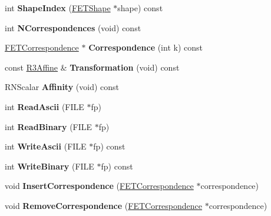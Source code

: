 \begin{DoxyCompactItemize}
\item 
int {\bfseries Shape\+Index} (\hyperlink{struct_f_e_t_shape}{F\+E\+T\+Shape} $\ast$shape) const \hypertarget{struct_f_e_t_match_a478ce4bcfb8b40f02ce15eede38cee40}{}\label{struct_f_e_t_match_a478ce4bcfb8b40f02ce15eede38cee40}

\item 
int {\bfseries N\+Correspondences} (void) const \hypertarget{struct_f_e_t_match_aeed07dd113bd282683fab8a2e571155c}{}\label{struct_f_e_t_match_aeed07dd113bd282683fab8a2e571155c}

\item 
\hyperlink{struct_f_e_t_correspondence}{F\+E\+T\+Correspondence} $\ast$ {\bfseries Correspondence} (int k) const \hypertarget{struct_f_e_t_match_a2b0a7502f99bd81638638783172712d9}{}\label{struct_f_e_t_match_a2b0a7502f99bd81638638783172712d9}

\item 
const \hyperlink{class_r3_affine}{R3\+Affine} \& {\bfseries Transformation} (void) const \hypertarget{struct_f_e_t_match_aaf48f529ceb079668a763c1973f849f1}{}\label{struct_f_e_t_match_aaf48f529ceb079668a763c1973f849f1}

\item 
R\+N\+Scalar {\bfseries Affinity} (void) const \hypertarget{struct_f_e_t_match_a4664694fe54dc49199419abf57dfea6f}{}\label{struct_f_e_t_match_a4664694fe54dc49199419abf57dfea6f}

\item 
int {\bfseries Read\+Ascii} (F\+I\+LE $\ast$fp)\hypertarget{struct_f_e_t_match_ab6fada98b0105c74d8ea603b25fa2a2b}{}\label{struct_f_e_t_match_ab6fada98b0105c74d8ea603b25fa2a2b}

\item 
int {\bfseries Read\+Binary} (F\+I\+LE $\ast$fp)\hypertarget{struct_f_e_t_match_a4fd8ec42dfdeffb1b7a9e9fdce7d6428}{}\label{struct_f_e_t_match_a4fd8ec42dfdeffb1b7a9e9fdce7d6428}

\item 
int {\bfseries Write\+Ascii} (F\+I\+LE $\ast$fp) const \hypertarget{struct_f_e_t_match_ae4342be77ec172fe1d35a3503c981efe}{}\label{struct_f_e_t_match_ae4342be77ec172fe1d35a3503c981efe}

\item 
int {\bfseries Write\+Binary} (F\+I\+LE $\ast$fp) const \hypertarget{struct_f_e_t_match_a7ca40aaaf3b559c8d6a665f675048cef}{}\label{struct_f_e_t_match_a7ca40aaaf3b559c8d6a665f675048cef}

\item 
void {\bfseries Insert\+Correspondence} (\hyperlink{struct_f_e_t_correspondence}{F\+E\+T\+Correspondence} $\ast$correspondence)\hypertarget{struct_f_e_t_match_a53a5f45347c6e5e6f81b0d1a5a010c6a}{}\label{struct_f_e_t_match_a53a5f45347c6e5e6f81b0d1a5a010c6a}

\item 
void {\bfseries Remove\+Correspondence} (\hyperlink{struct_f_e_t_correspondence}{F\+E\+T\+Correspondence} $\ast$correspondence)\hypertarget{struct_f_e_t_match_a4bb79334060d4bbd63a87a31cea8a75a}{}\label{struct_f_e_t_match_a4bb79334060d4bbd63a87a31cea8a75a}

\end{DoxyCompactItemize}
